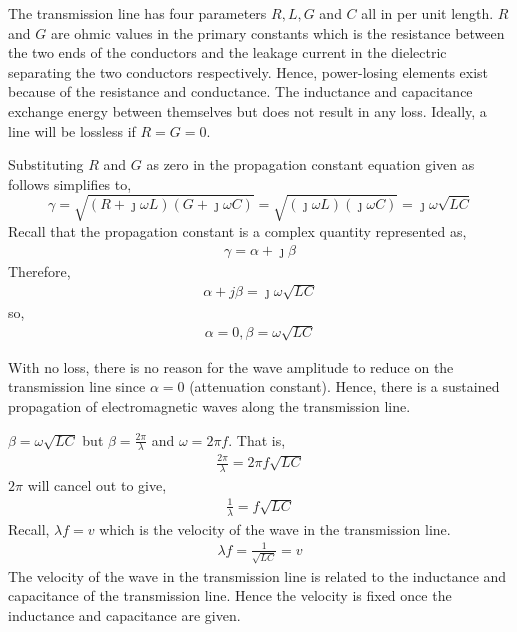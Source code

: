 The transmission line has four parameters $R, L, G$ and $C$ all in per unit length. $R$ and $G$ are ohmic values in the primary constants which is the resistance between the two ends of the conductors and the leakage current in the dielectric separating the two conductors respectively. Hence, power-losing elements exist because of the resistance and conductance. The inductance and capacitance exchange energy between themselves but does not result in any loss. Ideally, a line will be lossless if $R = G = 0$.

Substituting $R$ and $G$ as zero in the propagation constant equation given as follows simplifies to,
\begin{dmath*}
\gamma = \sqrt{(R + \jmath\omega L)(G + \jmath\omega C)}
= \sqrt{(\jmath\omega L)(\jmath\omega C)}
= \jmath\omega\sqrt{LC}
\end{dmath*}
Recall that the propagation constant is a complex quantity represented as,
\begin{align*}
\gamma = \alpha + \jmath\beta
\end{align*} 
Therefore,
\begin{align*}
\alpha + j\beta = \jmath\omega\sqrt{LC}
\end{align*}
so,
\begin{align*}
\alpha = 0, \beta = \omega\sqrt{LC}
\end{align*}

With no loss, there is no reason for the wave amplitude to reduce on the transmission line since $\alpha = 0$ (attenuation constant). Hence, there is a sustained propagation of electromagnetic waves along the transmission line.

$\beta = \omega\sqrt{LC}$ but $\beta = \frac{2\pi}{\lambda}$ and $\omega = 2\pi f $. That is,
\begin{align*}
\frac{2\pi}{\lambda} = 2\pi f\sqrt{LC}
\end{align*}
$2\pi$ will cancel out to give,
\begin{align*}
\frac{1}{\lambda} =  f\sqrt{LC}
\end{align*}
Recall, $\lambda f = v$ which is the velocity of the wave in the transmission line.
\begin{align*}
\lambda f = \frac{1}{\sqrt{LC}} = v
\end{align*}
The velocity of the wave in the transmission line is related to the inductance and capacitance of the transmission line. Hence the velocity is fixed once the inductance and capacitance are given.


